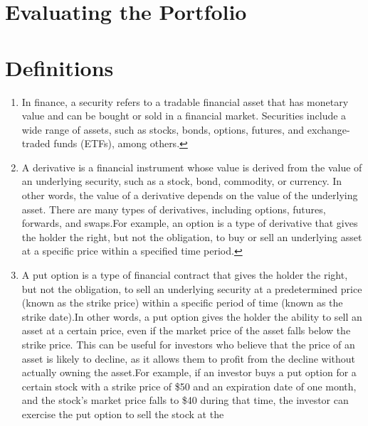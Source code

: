 \documentclass[
]{book}
\begin{document}
\hypertarget{evaluating-the-portfolio}{%
\chapter{Evaluating the Portfolio}\label{evaluating-the-portfolio}}

\hypertarget{appendix-appendix}{%
\appendix}


\hypertarget{def}{%
\chapter{Definitions}\label{def}}

\begin{enumerate}
\def\labelenumi{\arabic{enumi}.}
\item
  In finance, a security refers to a tradable financial asset that has monetary
  value and can be bought or sold in a financial market. Securities include a wide
  range of assets, such as stocks, bonds, options, futures, and exchange-traded
  funds (ETFs), among others.\protect\hyperlink{intro}{↩︎}
\item
  A derivative is a financial instrument whose value is derived from the value
  of an underlying security, such as a stock, bond, commodity, or currency.
  In other words, the value of a derivative depends on the value of the underlying
  asset. There are many types of derivatives, including options, futures,
  forwards, and swaps.For example, an option is a type of derivative that
  gives the holder the right, but not the obligation, to buy or sell an underlying
  asset at a specific price within a specified time period.\protect\hyperlink{intro}{↩︎}
\item
  A put option is a type of financial contract that gives the holder the right,
  but not the obligation, to sell an underlying security at a predetermined price
  (known as the strike price) within a specific period of time (known as the
  strike date).In other words, a put option gives the holder the ability
  to sell an asset at a certain price, even if the market price of the asset falls
  below the strike price. This can be useful for investors who believe that the
  price of an asset is likely to decline, as it allows them to profit from the
  decline without actually owning the asset.For example, if an investor
  buys a put option for a certain stock with a strike price of \$50 and an
  expiration date of one month, and the stock's market price falls to \$40 during
  that time, the investor can exercise the put option to sell the stock at the

\end{enumerate}
\end{document}
